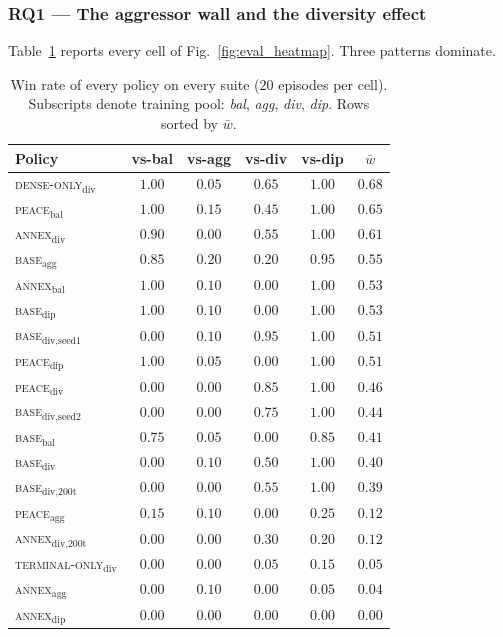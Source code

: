 \subsubsection{RQ1 --- The aggressor wall and the diversity effect}
\label{sec:rq1}

Table~\ref{tab:winrate_summary} reports every cell of
Fig.~\ref{fig:eval_heatmap}. Three patterns dominate.

\begin{table}[h]
\centering
\small
\begin{tabular}{lcccc|c}
\toprule
Policy & vs-bal & vs-agg & vs-div & vs-dip & $\bar{w}$ \\
\midrule
\textsc{dense-only}$_{\text{div}}$       & $1.00$ & $0.05$ & $0.65$ & $1.00$ & $\mathbf{0.68}$ \\
\textsc{peace}$_{\text{bal}}$            & $1.00$ & $0.15$ & $0.45$ & $1.00$ & $0.65$ \\
\textsc{annex}$_{\text{div}}$            & $0.90$ & $0.00$ & $0.55$ & $1.00$ & $0.61$ \\
\textsc{base}$_{\text{agg}}$             & $0.85$ & $0.20$ & $0.20$ & $0.95$ & $0.55$ \\
\textsc{annex}$_{\text{bal}}$            & $1.00$ & $0.10$ & $0.00$ & $1.00$ & $0.53$ \\
\textsc{base}$_{\text{dip}}$             & $1.00$ & $0.10$ & $0.00$ & $1.00$ & $0.53$ \\
\textsc{base}$_{\text{div,seed1}}$       & $0.00$ & $0.10$ & $0.95$ & $1.00$ & $0.51$ \\
\textsc{peace}$_{\text{dip}}$            & $1.00$ & $0.05$ & $0.00$ & $1.00$ & $0.51$ \\
\textsc{peace}$_{\text{div}}$            & $0.00$ & $0.00$ & $0.85$ & $1.00$ & $0.46$ \\
\textsc{base}$_{\text{div,seed2}}$       & $0.00$ & $0.00$ & $0.75$ & $1.00$ & $0.44$ \\
\textsc{base}$_{\text{bal}}$             & $0.75$ & $0.05$ & $0.00$ & $0.85$ & $0.41$ \\
\textsc{base}$_{\text{div}}$             & $0.00$ & $0.10$ & $0.50$ & $1.00$ & $0.40$ \\
\textsc{base}$_{\text{div,200t}}$        & $0.00$ & $0.00$ & $0.55$ & $1.00$ & $0.39$ \\
\textsc{peace}$_{\text{agg}}$            & $0.15$ & $0.10$ & $0.00$ & $0.25$ & $0.12$ \\
\textsc{annex}$_{\text{div,200t}}$       & $0.00$ & $0.00$ & $0.30$ & $0.20$ & $0.12$ \\
\textsc{terminal-only}$_{\text{div}}$    & $0.00$ & $0.00$ & $0.05$ & $0.15$ & $0.05$ \\
\textsc{annex}$_{\text{agg}}$            & $0.00$ & $0.10$ & $0.00$ & $0.05$ & $0.04$ \\
\textsc{annex}$_{\text{dip}}$            & $0.00$ & $0.00$ & $0.00$ & $0.00$ & $0.00$ \\
\bottomrule
\end{tabular}
\caption{Win rate of every policy on every suite ($20$ episodes per cell).
Subscripts denote training pool: \textit{bal}, \textit{agg}, \textit{div},
\textit{dip}. Rows sorted by $\bar{w}$.}
\label{tab:winrate_summary}
\end{table}

